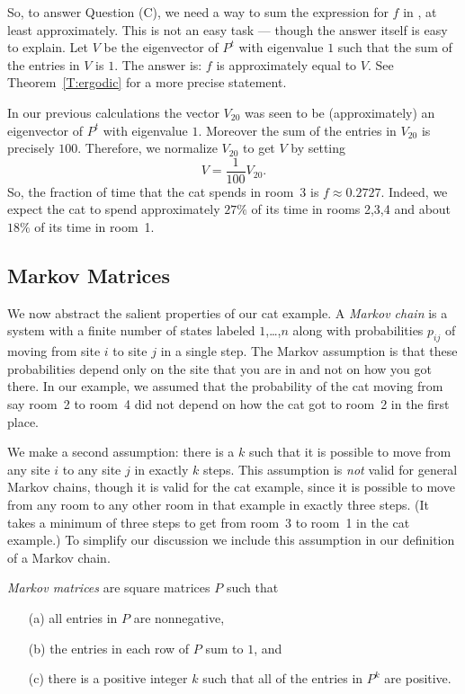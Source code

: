 So, to answer Question (C), we need a way to sum the expression for $f$
in , at least approximately.  This is not an easy task --- though
the answer itself is easy to explain.  Let $V$ be the eigenvector of $P^t$
with eigenvalue $1$ such that the sum of the entries in $V$ is $1$.  The
answer is: $f$ is approximately equal to $V$.  See Theorem~\ref{T:ergodic}
for a more precise statement.

In our previous calculations the vector $V_{20}$ was seen to be (approximately)
an eigenvector of $P^t$ with eigenvalue $1$.  Moreover the sum of the entries
in $V_{20}$ is precisely $100$.  Therefore, we normalize $V_{20}$ to get $V$
by setting
\[
V =\frac{1}{100}V_{20}.
\]
So, the fraction of time that the cat spends in room~3 is $f\approx 0.2727$.
Indeed, we expect the cat to spend approximately $27\%$ of its time in rooms
2,3,4 and about $18\%$ of its time in room~1.

\subsection*{Markov Matrices}

We now abstract the salient properties of our cat example.  A
{\em Markov chain\/} is a system with a
finite number of states labeled
$1$,\dots,$n$ along with probabilities $p_{ij}$ of moving from site $i$ to
site $j$ in a single step.  The Markov assumption is that these probabilities
depend only on the site that you are in and not on how you got there.  In our
example, we assumed that the probability of the cat moving from say room~2 to
room~4 did not depend on how the cat got to room~2 in the first place.

We make a second assumption: there is a $k$ such that it is possible to move
from any site $i$ to any site $j$ in exactly $k$ steps.  This assumption is
{\em not\/} valid for general Markov chains, though it is valid for the cat
example, since it is possible to move from any room to any other room in that
example in exactly three steps.  (It takes a minimum of three steps to get
from room~3 to room~1 in the cat example.)  To simplify our discussion we
include this assumption in our definition of a Markov chain.

\begin{Def}  \label{D:Markov}
{\em Markov matrices\/} are square matrices
$P$ such that
\begin{enumerate}
\item[(a)]  all entries in $P$ are nonnegative,
\item[(b)]  the entries in each row of $P$ sum to $1$, and
\item[(c)]  there is a positive integer $k$ such that all of the entries
	in $P^k$ are positive.
\end{enumerate}
\end{Def}

